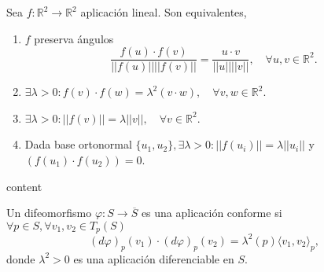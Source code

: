 \begin{prop}
  Sea $f : \mathbb{R}^{2} \to \mathbb{R}^{2}$ aplicación lineal. Son equivalentes,
  \begin{enumerate}[label=(\roman*)]
    \item $f$ preserva ángulos
      \[ 
        \frac{f(u) \cdot f(v)}{||f(u)|| ||f(v)||} = \frac{u \cdot v}{||u|| ||v||}, \quad \forall u, v \in \mathbb{R}^{2}.
      \] 
    \item $\exists \lambda > 0 : f(v) \cdot f(w) = \lambda^{2} (v \cdot w), \quad \forall v, w \in \mathbb{R}^{2}$.
    \item $\exists \lambda > 0 : || f(v)|| = \lambda ||v||, \quad \forall v \in \mathbb{R}^{2}$.
    \item Dada base ortonormal $\{ u_{1}, u_{2} \}, \exists \lambda > 0 : ||f(u_{i})|| = \lambda ||u_{i}||$ y $(f(u_{1}) \cdot f(u_{2})) = 0$.
  \end{enumerate}
\end{prop}

\begin{dem}
  content
\end{dem}

\begin{defn}
  Un difeomorfismo $\varphi : S \to \overline{S}$ es una aplicación conforme si $\forall p \in S, \forall v_{1}, v_{2} \in T_{p}(S)$ 
  \[ 
    (d \varphi)_{p}(v_{1}) \cdot (d \varphi)_{p}(v_{2}) = \lambda^{2}(p) \langle v_{1}{ , }v_{2} \rangle_{p},
  \] 
  donde $\lambda^{2}> 0$ es una aplicación diferenciable en $S$.
\end{defn}
